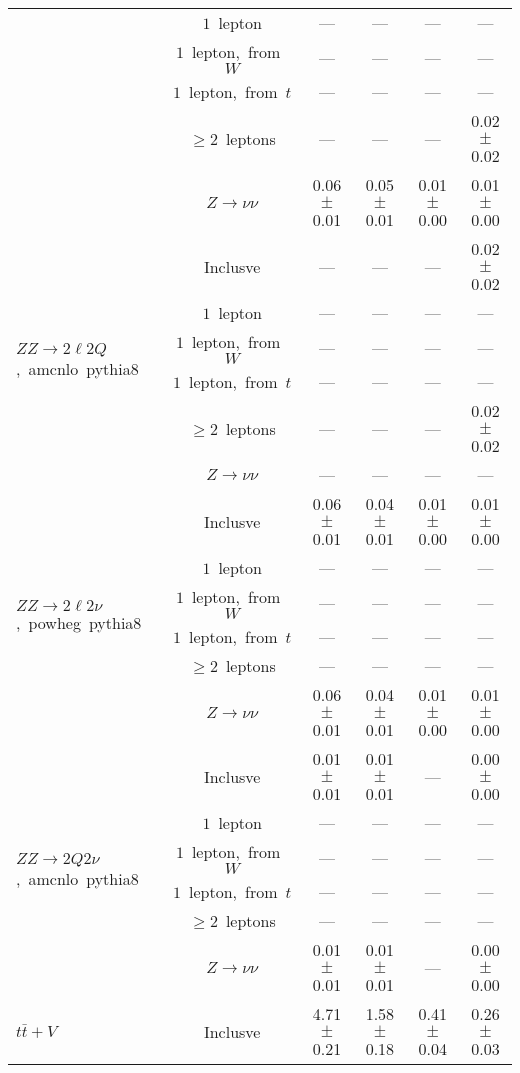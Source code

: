 \documentclass{article}
\begin{document}
\begin{longtable}{|l|c|c|c|c|c|}
 & $1$~lepton  & ---  & ---  & ---  & --- \\* 
 & $1$~lepton,~from~$W$  & ---  & ---  & ---  & --- \\* 
 & $1$~lepton,~from~$t$  & ---  & ---  & ---  & --- \\* 
 & $\ge2$~leptons  & ---  & ---  & ---  & 0.02 $\pm$ 0.02 \\* 
 & $Z\rightarrow\nu\nu$  & 0.06 $\pm$ 0.01  & 0.05 $\pm$ 0.01  & 0.01 $\pm$ 0.00  & 0.01 $\pm$ 0.00 \\* 
\hline 
\multirow{6}{*}{$ZZ{\rightarrow}2{\ell}2Q$,~amcnlo~pythia8} & Inclusve  & ---  & ---  & ---  & 0.02 $\pm$ 0.02 \\* 
 & $1$~lepton  & ---  & ---  & ---  & --- \\* 
 & $1$~lepton,~from~$W$  & ---  & ---  & ---  & --- \\* 
 & $1$~lepton,~from~$t$  & ---  & ---  & ---  & --- \\* 
 & $\ge2$~leptons  & ---  & ---  & ---  & 0.02 $\pm$ 0.02 \\* 
 & $Z\rightarrow\nu\nu$  & ---  & ---  & ---  & --- \\* 
\hline 
\multirow{6}{*}{$ZZ{\rightarrow}2{\ell}2{\nu}$,~powheg~pythia8} & Inclusve  & 0.06 $\pm$ 0.01  & 0.04 $\pm$ 0.01  & 0.01 $\pm$ 0.00  & 0.01 $\pm$ 0.00 \\* 
 & $1$~lepton  & ---  & ---  & ---  & --- \\* 
 & $1$~lepton,~from~$W$  & ---  & ---  & ---  & --- \\* 
 & $1$~lepton,~from~$t$  & ---  & ---  & ---  & --- \\* 
 & $\ge2$~leptons  & ---  & ---  & ---  & --- \\* 
 & $Z\rightarrow\nu\nu$  & 0.06 $\pm$ 0.01  & 0.04 $\pm$ 0.01  & 0.01 $\pm$ 0.00  & 0.01 $\pm$ 0.00 \\* 
\hline 
\multirow{6}{*}{$ZZ{\rightarrow}2Q2{\nu}$,~amcnlo~pythia8} & Inclusve  & 0.01 $\pm$ 0.01  & 0.01 $\pm$ 0.01  & ---  & 0.00 $\pm$ 0.00 \\* 
 & $1$~lepton  & ---  & ---  & ---  & --- \\* 
 & $1$~lepton,~from~$W$  & ---  & ---  & ---  & --- \\* 
 & $1$~lepton,~from~$t$  & ---  & ---  & ---  & --- \\* 
 & $\ge2$~leptons  & ---  & ---  & ---  & --- \\* 
 & $Z\rightarrow\nu\nu$  & 0.01 $\pm$ 0.01  & 0.01 $\pm$ 0.01  & ---  & 0.00 $\pm$ 0.00 \\* 
\hline 
\multirow{6}{*}{$t\bar{t}+V$} & Inclusve  & 4.71 $\pm$ 0.21  & 1.58 $\pm$ 0.18  & 0.41 $\pm$ 0.04  & 0.26 $\pm$ 0.03 \\* 

\end{longtable}
\end{document}
